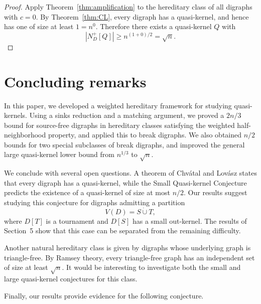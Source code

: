 \documentclass[11pt,a4paper]{article}
\begin{document}
\begin{proof}
Apply Theorem~\ref{thm:amplification} to the hereditary class of all digraphs
with \(c=0\). By Theorem~\ref{thm:CL}, every digraph has a quasi-kernel, and hence has one of
size at least \(1=n^0\). Therefore there exists a quasi-kernel \(Q\) with
\[
    |N_D^+[Q]|\ge n^{(1+0)/2}=\sqrt n .
\]
\end{proof}




\section{Concluding remarks}

In this paper, we developed a weighted hereditary framework for studying quasi-kernels. Using a sinks reduction and a matching argument, we proved a \(2n/3\) bound for source-free digraphs in hereditary classes satisfying the weighted half-neighborhood property, and applied this to break digraphs. We also obtained \(n/2\) bounds for two special subclasses of break digraphs, and improved the general large quasi-kernel lower bound from \(n^{1/3}\) to \(\sqrt n\).

We conclude with several open questions.
A theorem of Chv\'atal and Lov\'asz states that every digraph has a quasi-kernel,
while the Small Quasi-kernel Conjecture predicts the existence of a quasi-kernel
of size at most \(n/2\). Our results suggest studying this conjecture for
digraphs admitting a partition
\[
V(D)=S\dot\cup T,
\]
where \(D[T]\) is a tournament and \(D[S]\) has a small out-kernel. The results of
Section~5 show that this case can be separated from the remaining difficulty.

Another natural hereditary class is given by digraphs whose underlying graph is
triangle-free. By Ramsey theory, every triangle-free graph has an independent
set of size at least \(\sqrt n\). It would be interesting to investigate both
the small and large quasi-kernel conjectures for this class.

Finally, our results provide evidence for the following conjecture.
\end{document}
